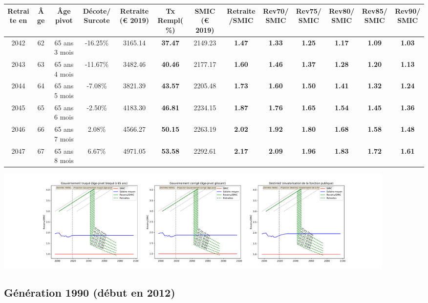 { \scriptsize \begin{center} 
\begin{tabular}[htb]{|c|c||c|c||c|c||c||c|c|c|c|c|c|} 
\hline 
 Retraite en &  Âge &  Âge pivot &  Décote/Surcote &  Retraite (\euro{} 2019) &  Tx Rempl(\%) &  SMIC (\euro{} 2019) &  Retraite/SMIC &  Rev70/SMIC &  Rev75/SMIC &  Rev80/SMIC &  Rev85/SMIC &  Rev90/SMIC \\ 
\hline \hline 
 2042 &  62 &  65 ans 3 mois &  -16.25\% &  3165.14 &  {\bf 37.47} &  2149.23 &  {\bf 1.47} &  {\bf 1.33} &  {\bf 1.25} &  {\bf 1.17} &  {\bf 1.09} &  {\bf 1.03} \\ 
\hline 
 2043 &  63 &  65 ans 4 mois &  -11.67\% &  3482.46 &  {\bf 40.46} &  2177.17 &  {\bf 1.60} &  {\bf 1.46} &  {\bf 1.37} &  {\bf 1.28} &  {\bf 1.20} &  {\bf 1.13} \\ 
\hline 
 2044 &  64 &  65 ans 5 mois &  -7.08\% &  3821.39 &  {\bf 43.57} &  2205.48 &  {\bf 1.73} &  {\bf 1.60} &  {\bf 1.50} &  {\bf 1.41} &  {\bf 1.32} &  {\bf 1.24} \\ 
\hline 
 2045 &  65 &  65 ans 6 mois &  -2.50\% &  4183.30 &  {\bf 46.81} &  2234.15 &  {\bf 1.87} &  {\bf 1.76} &  {\bf 1.65} &  {\bf 1.54} &  {\bf 1.45} &  {\bf 1.36} \\ 
\hline 
 2046 &  66 &  65 ans 7 mois &  2.08\% &  4566.27 &  {\bf 50.15} &  2263.19 &  {\bf 2.02} &  {\bf 1.92} &  {\bf 1.80} &  {\bf 1.68} &  {\bf 1.58} &  {\bf 1.48} \\ 
\hline 
 2047 &  67 &  65 ans 8 mois &  6.67\% &  4971.05 &  {\bf 53.58} &  2292.61 &  {\bf 2.17} &  {\bf 2.09} &  {\bf 1.96} &  {\bf 1.83} &  {\bf 1.72} &  {\bf 1.61} \\ 
\hline 
\hline 
\end{tabular} 
\end{center} } 

 \begin{center}\includegraphics[width=0.9\textwidth]{fig/Ascendant34_1980_22_dest_retraite.pdf}\end{center} \label{fig/Ascendant34_1980_22_dest_retraite.pdf} 

\newpage 
 
\subsection{Génération 1990 (début en 2012)} 

